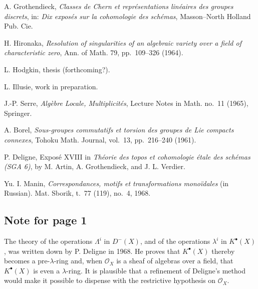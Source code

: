 \begin{enumerate}[label={[\arabic*]},leftmargin=3.2em]
\item A. Grothendieck,
  \emph{Classes de Chern et repr\'esentations lin\'eaires des groupes
  discrets}, in: \emph{Dix expos\'es sur la cohomologie des sch\'emas},
  Masson--North Holland Pub. Cie.

\item H. Hironaka,
  \emph{Resolution of singularities of an algebraic variety over a field of
  characteristic zero}, Ann. of Math. 79, pp.~109--326 (1964).

\item L. Hodgkin, thesis (forthcoming?).

\item L. Illusie, work in preparation.

\item J.-P. Serre, \emph{Alg\`ebre Locale, Multiplicit\'es},
  Lecture Notes in Math. no.~11 (1965), Springer.

\item A. Borel,
  \emph{Sous-groupes commutatifs et torsion des groupes de Lie compacts
  connexes}, Tohoku Math. Journal, vol.~13, pp.~216--240 (1961).

\item[{[16]}(*)] P. Deligne, Expos\'e XVIII in
  \emph{Th\'eorie des topos et cohomologie \'etale des sch\'emas (SGA 6)},
  by M. Artin, A. Grothendieck, and J. L. Verdier.

\item[{[17]}(*)] Yu. I. Manin,
  \emph{Correspondances, motifs et transformations mono\"idales}
  (in Russian). Mat. Sborik, t.~77 (119), no.~4, 1968.
\end{enumerate}


\subsection*{Note for page 1}

The theory of the operations $\Lambda^i$ in $D^{-}(X)$, and of the
operations $\lambda^i$ in $K^\bullet(X)$, was written down by P. Deligne in
1968. He proves that $K^\bullet(X)$ thereby becomes a pre-$\lambda$-ring and,
when $\mathcal O_X$ is a sheaf of algebras over a field, that
$K^\bullet(X)$ is even a $\lambda$-ring. It is plausible that a refinement
of Deligne's method would make it possible to dispense with the restrictive
hypothesis on $\mathcal O_X$.

